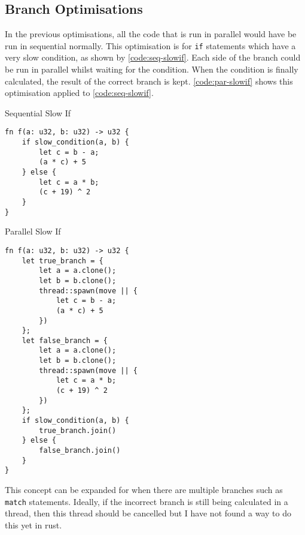 \documentclass[conference]{IEEEtran}
\begin{document}
\subsection{Branch Optimisations}
In the previous optimisations, all the code that is run in parallel would have be run in sequential normally. This optimisation is for \texttt{if} statements which have a very slow condition, as shown by \autoref{code:seq-slowif}. Each side of the branch could be run in parallel whilst waiting for the condition. When the condition is finally calculated, the result of the correct branch is kept. \autoref{code:par-slowif} shows this optimisation applied to \autoref{code:seq-slowif}.

\begin{algorithm}
\caption{Sequential Slow If}
\label{code:seq-slowif}
\begin{verbatim}
fn f(a: u32, b: u32) -> u32 {
    if slow_condition(a, b) {
        let c = b - a;
        (a * c) + 5
    } else {
        let c = a * b;
        (c + 19) ^ 2
    }
}
\end{verbatim}
\end{algorithm}

\begin{algorithm}
\caption{Parallel Slow If}
\label{code:par-slowif}
\begin{verbatim}
fn f(a: u32, b: u32) -> u32 {
    let true_branch = {
        let a = a.clone();
        let b = b.clone();
        thread::spawn(move || {
            let c = b - a;
            (a * c) + 5
        })
    };
    let false_branch = {
        let a = a.clone();
        let b = b.clone();
        thread::spawn(move || {
            let c = a * b;
            (c + 19) ^ 2
        })
    };
    if slow_condition(a, b) {
        true_branch.join()
    } else {
        false_branch.join()
    }
}

\end{verbatim}
\end{algorithm}

This concept can be expanded for when there are multiple branches such as \texttt{match} statements. Ideally, if the incorrect branch is still being calculated in a thread, then this thread should be cancelled but I have not found a way to do this yet in rust.
\end{document}
